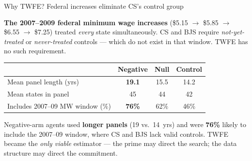 \documentclass[aspectratio=169,12pt,t]{beamer}
\begin{document}
\begin{frame}{Why TWFE? Federal increases eliminate CS's control group}
\vspace{0.3cm}

\textbf{The 2007--2009 federal minimum wage increases} (\$5.15 $\to$ \$5.85 $\to$ \$6.55 $\to$ \$7.25) treated \textit{every} state simultaneously.
CS and BJS require \textit{not-yet-treated} or \textit{never-treated} controls --- which do not exist in that window.
TWFE has no such requirement.

\vspace{0.4cm}

\begin{center}
\small
\setlength{\tabcolsep}{12pt}
\begin{tabular}{lccc}
  \toprule
  & \textbf{Negative} & \textbf{Null} & \textbf{Control} \\
  \midrule
  Mean panel length (yrs)       & \textbf{19.1} & 15.5 & 14.2 \\[3pt]
  Mean states in panel          & 45 & 44 & 42 \\[3pt]
  Includes 2007--09 MW window (\%) & \textbf{76\%} & 62\% & 46\% \\
  \bottomrule
\end{tabular}
\end{center}

\vspace{0.3cm}
{\small\color{warmgray}
Negative-arm agents used \textbf{longer panels} (19 vs.\ 14~yrs) and were \textbf{76\%} likely to include the 2007--09 window, where CS and BJS lack valid controls. TWFE became the \textit{only viable} estimator --- the prime may direct the search; the data structure may direct the commitment.}

\end{frame}
\end{document}
